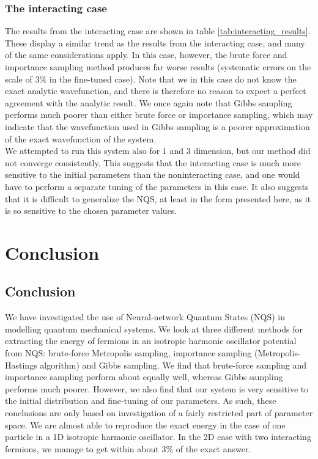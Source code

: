 \documentclass[a4paper, 10pt]{article}
\begin{document}
\subsubsection{The interacting case}\label{sec:disc_result_interacting}
The results from the interacting case are shown in table \ref{tab:interacting_results}. These display a similar trend as the results from the interacting case, and many of the same considerations apply. In this case, however, the brute force and importance sampling method produces far worse results (systematic errors on the scale of $3\%$ in the fine-tuned case). Note that we in this case do not know the exact analytic wavefunction, and there is therefore no reason to expect a perfect agreement with the analytic result. We once again note that Gibbs sampling performs much poorer than either brute force or importance sampling, which may indicate that the wavefunction used in Gibbs sampling is a poorer approximation of the exact wavefunction of the system.\\
\linebreak
We attempted to run this system also for $1$ and $3$ dimension, but our method did not converge consistently. This suggests that the interacting case is much more sensitive to the initial parameters than the noninteracting case, and one would have to perform a separate tuning of the parameters in this case. It also suggests that it is difficult to generalize the NQS, at least in the form presented here, as it is so sensitive to the chosen parameter values.
\section{Conclusion}
\subsection{Conclusion}
We have investigated the use of Neural-network Quantum States (NQS) in modelling quantum mechanical systems. We look at three different methods for extracting the energy of fermions in an isotropic harmonic oscillator potential from NQS: brute-force Metropolis sampling, importance sampling (Metropolis-Hastings algorithm) and Gibbs sampling. We find that brute-force sampling and importance sampling perform about equally well, whereas Gibbs sampling performs much poorer. However, we also find that our system is very sensitive to the initial distribution and fine-tuning of our parameters. As such, these conclusions are only based on investigation of a fairly restricted part of parameter space. We are almost able to reproduce the exact energy in the case of one particle in a 1D isotropic harmonic oscillator. In the 2D case with two interacting fermions, we manage to get within about $3\%$ of the exact answer.
\end{document}

